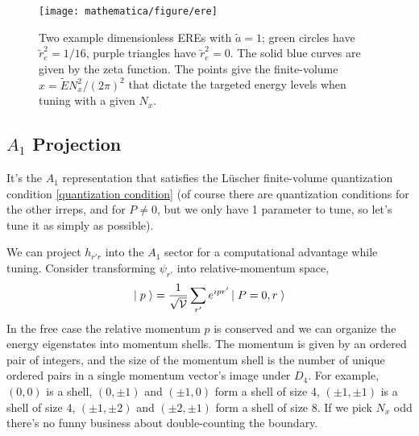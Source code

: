 \begin{figure}
	\texttt{[image: mathematica/figure/ere]}
	\caption{
		Two example dimensionless EREs with $\tilde{a}=1$; green circles have $\tilde{r}_e^2=1/16$, purple triangles have $\tilde{r}_e^2=0$.
		The solid blue curves are given by the zeta function.
		The points give the finite-volume $x = \tilde{E} N_x^2 / (2\pi)^2$ that dictate the targeted energy levels when tuning with a given $N_x$.
	}
	\label{fig:ere tuning}
\end{figure}

\subsection{$A_1$ Projection}

It's the $A_1$ representation that satisfies the L\"{u}scher finite-volume quantization condition \eqref{quantization condition} (of course there are quantization conditions for the other irreps, and for $P\neq 0$, but we only have 1 parameter to tune, so let's tune it as simply as possible).

We can project $h_{r'r}$ into the $A_1$ sector for a computational advantage while tuning.
Consider transforming $\psi_{r'}$ into relative-momentum space,
\begin{align}
    \left|\;p\;\right\rangle = \frac{1}{\sqrt{\mathcal{V}}}\sum_{r'} e^{ipr'} \left|\;P=0, r\;\right\rangle
\end{align}
In the free case the relative momentum $p$ is conserved and we can organize the energy eigenstates into momentum shells.
The momentum is given by an ordered pair of integers, and the size of the momentum shell is the number of unique ordered pairs in a single momentum vector's image under $D_4$.
For example, $(0,0)$ is a shell, $(0,\pm 1)$ and $(\pm 1, 0)$ form a shell of size 4, $(\pm 1, \pm 1)$ is a shell of size 4, $(\pm 1, \pm 2)$ and $(\pm 2, \pm 1)$ form a shell of size 8.
If we pick $N_x$ odd there's no funny business about double-counting the boundary.


